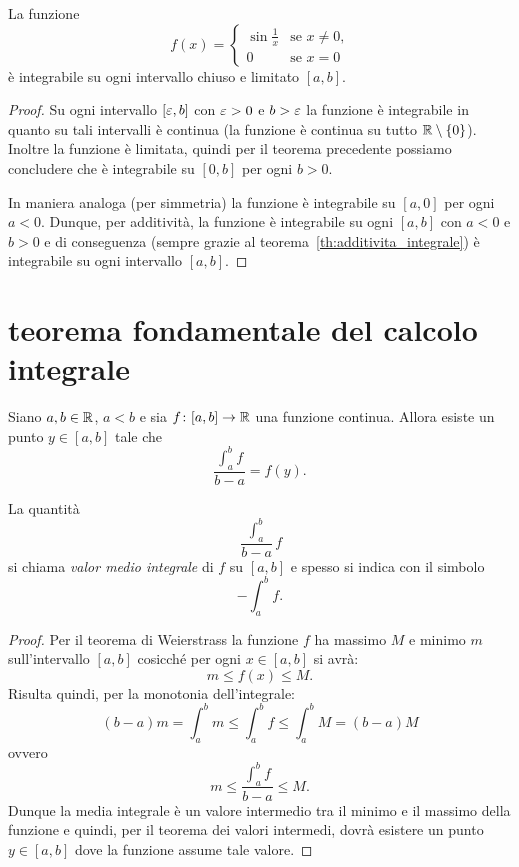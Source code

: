 \begin{example}
La funzione
\[
  f(x) = \begin{cases}
  \sin\frac 1 x & \text{se $x\neq 0$,}\\
  0 & \text{se $x=0$}
  \end{cases}
\]
è integrabile su ogni intervallo chiuso e limitato $[a,b]$.
\end{example}
\begin{proof}
Su ogni intervallo $[\varepsilon,b]$ con $\varepsilon>0$ e $b>\varepsilon$ la funzione
è integrabile in quanto su tali intervalli è continua (la funzione è continua su
tutto $\mathbb R\setminus{\left\{ 0 \right\}}$). Inoltre la funzione è limitata, quindi per il teorema
precedente possiamo concludere che è integrabile su $[0,b]$ per ogni $b>0$.

In maniera analoga (per simmetria) la funzione è integrabile su $[a,0]$
per ogni $a<0$.
Dunque, per additività, la funzione è integrabile su ogni $[a,b]$ con $a<0$ e $b>0$
e di conseguenza (sempre grazie al teorema~\ref{th:additivita_integrale})
è integrabile su ogni intervallo $[a,b]$.
\end{proof}

\section{teorema fondamentale del calcolo integrale}

\begin{theorem}%
\label{th:media_integrale}%
\mymark{***}%
Siano $a,b\in \mathbb R$, $a<b$ e sia
$f\colon [a,b] \to \mathbb R$ una funzione continua.
Allora esiste un punto $y \in [a,b]$
tale che
\[
\frac{\int_a^b f}{b-a} = f(y).
\]
\end{theorem}
%
La quantità
\[
  \frac{\int_a^b}{b-a} f
\]
si chiama \emph{valor medio integrale} di $f$ su $[a,b]$ e spesso
si indica con il simbolo
\[
  -\!\!\!\!\!\!\int_a^b f.
\]
%
\begin{proof}
\mymark{***}
Per il teorema di Weierstrass la funzione $f$ ha massimo $M$ e minimo $m$
sull'intervallo $[a,b]$ cosicché
per ogni $x\in [a,b]$ si avrà:
\[
  m \le f(x) \le M.
\]
Risulta quindi, per la monotonia dell'integrale:
\[
  (b-a) m = \int_a^b m \le \int_a^b f \le \int_a^b M = (b-a) M
\]
ovvero
\[
  m \le \frac{\int_a^b f}{b-a} \le M.
\]
Dunque la media integrale è un valore intermedio tra il minimo e il massimo
della funzione e quindi, per il teorema dei valori intermedi,
dovrà esistere un punto $y\in [a,b]$ dove la funzione assume tale valore.
\end{proof}


